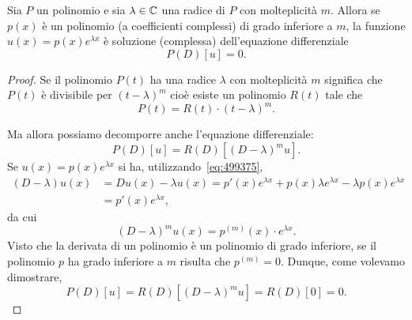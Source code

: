 \begin{theorem}
\mymark{***}
Sia $P$ un polinomio e sia $\lambda\in \mathbb C$ una radice di $P$ con molteplicità $m$.
Allora se $p(x)$ è un polinomio (a coefficienti complessi) di grado inferiore a $m$,
la funzione $u(x) = p(x) e^{\lambda x}$ è soluzione (complessa) dell'equazione differenziale
\[
   P(D) [u] = 0.
\]
\end{theorem}
%
\begin{proof}
\mymark{***}
Se il polinomio $P(t)$ ha una radice $\lambda$ con molteplicità $m$ significa che $P(t)$ è divisibile per $(t-\lambda)^m$ cioè esiste un polinomio $R(t)$ tale che
\[
  P(t) = R(t)\cdot (t-\lambda)^m.
\]

Ma allora possiamo decomporre anche l'equazione differenziale:
\[
 P(D) [u] = R(D)[(D - \lambda)^m u].
\]
Se $u(x) = p(x) e^{\lambda x}$ si ha,
utilizzando~\eqref{eq:499375},
\begin{align*}
  (D-\lambda) u(x) &= Du(x) -\lambda u(x) =
  p'(x) e^{\lambda x} + p(x) \lambda e^{\lambda x} - \lambda p(x) e^{\lambda x} \\
  &= p'(x) e^{\lambda x},
\end{align*}
da cui
\[
  (D-\lambda)^m u(x) = p^{(m)}(x) \cdot e^{\lambda x}.
\]
Visto che la derivata di un polinomio è un polinomio di grado inferiore,
se il polinomio $p$ ha grado inferiore a $m$ risulta che $p^{(m)}=0$.
Dunque, come volevamo dimostrare,
\[
 P(D) [u] = R(D) [(D-\lambda)^m u] = R(D) [0] = 0.
\]
\end{proof}

